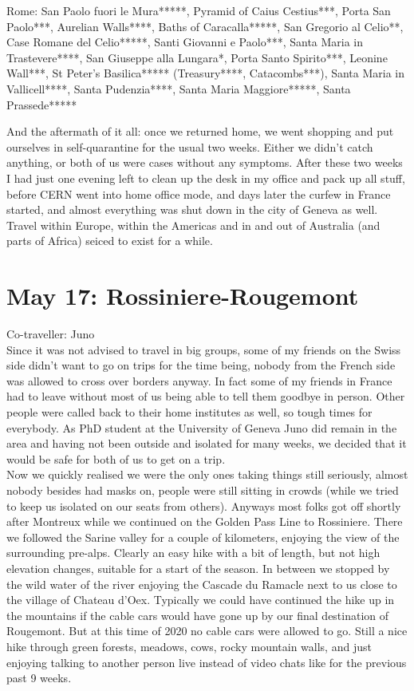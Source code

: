 Rome: San Paolo fuori le Mura*****, Pyramid of Caius Cestius***, Porta San Paolo***, Aurelian Walls****, Baths of Caracalla*****, San Gregorio al Celio**, Case Romane del Celio*****, Santi Giovanni e Paolo***, Santa Maria in Trastevere****, San Giuseppe alla Lungara*, Porta Santo Spirito***, Leonine Wall***, St Peter's Basilica***** (Treasury****, Catacombs***), Santa Maria in Vallicell****, Santa Pudenzia****, Santa Maria Maggiore*****, Santa Prassede***** %

 And the aftermath of it all: once we returned home, we went shopping and put ourselves in self-quarantine for the usual two weeks. Either we didn't catch anything, or both of us were cases without any symptoms. After these two weeks I had just one evening left to clean up the desk in my office and pack up all stuff, before CERN went into home office mode, and days later the curfew in France started, and almost everything was shut down in the city of Geneva as well. Travel within Europe, within the Americas and in and out of Australia (and parts of Africa) seiced to exist for a while.\\
 
 \section{May 17: Rossiniere-Rougemont}
\label{2020:Rossiniere}

Co-traveller: Juno\\
Since it was not advised to travel in big groups, some of my friends on the Swiss side didn't want to go on trips for the time being, nobody from the French side was allowed to cross over borders anyway. In fact some of my friends in France had to leave without most of us being able to tell them goodbye in person. Other people were called back to their home institutes as well, so tough times for everybody. As PhD student at the University of Geneva Juno did remain in the area and having not been outside and isolated for many weeks, we decided that it would be safe for both of us to get on a trip.\\

Now we quickly realised we were the only ones taking things still seriously, almost nobody besides had masks on, people were still sitting in crowds (while we tried to keep us isolated on our seats from others). Anyways most folks got off shortly after Montreux while we continued on the Golden Pass Line to Rossiniere. There we followed the Sarine valley for a couple of kilometers, enjoying the view of the surrounding pre-alps. Clearly an easy hike with a bit of length, but not high elevation changes, suitable for a start of the season. In between we stopped by the wild water of the river enjoying the Cascade du Ramacle next to us close to the village of Chateau d'Oex. Typically we could have continued the hike up in the mountains if the cable cars would have gone up by our final destination of Rougemont. But at this time of 2020 no cable cars were allowed to go. Still a nice hike through green forests, meadows, cows, rocky mountain walls, and just enjoying talking to another person live instead of video chats like for the previous past 9 weeks.\\

